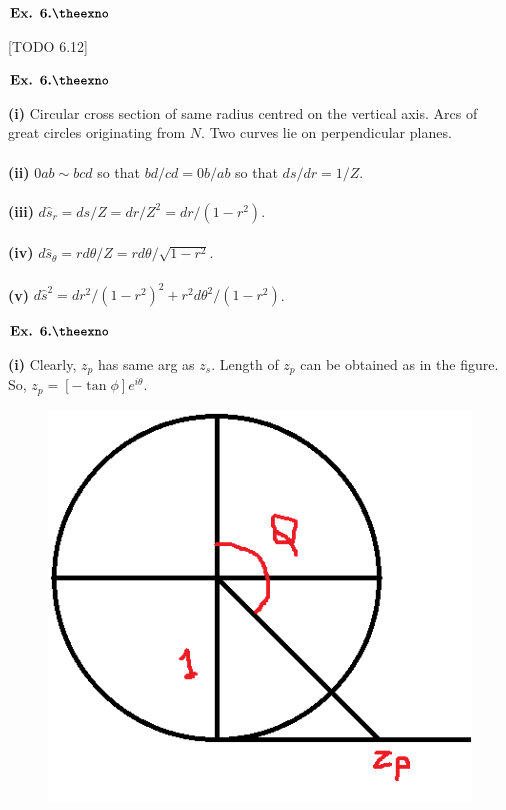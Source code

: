 \documentclass{article}
\def\tf{\textbf}
\newcounter{exno}
\begin{document}
\vspace{0.2in}

${\textbf{Ex. 6.\theexno}}$
\addtocounter{exno}{1}

[TODO 6.12]

\vspace{0.2in}

${\textbf{Ex. 6.\theexno}}$
\addtocounter{exno}{1}

\tf{(i)} Circular cross section of same radius centred on the vertical axis. Arcs of great circles originating from $N$. Two curves lie on perpendicular planes.\\~\\

\tf{(ii)} $0ab \sim bcd$ so that $bd/cd = 0b/ab$ so that $ds/dr = 1/Z$.\\~\\

\tf{(iii)} $d\hat{s}_r = ds/Z = dr/Z^2 = dr/(1-r^2)$.\\~\\

\tf{(iv)} $d\hat{s}_\theta = rd\theta/Z = rd\theta/\sqrt{1-r^2}$.\\~\\

\tf{(v)} $d\hat{s}^2 = dr^2/(1-r^2)^2 + r^2d\theta^2/(1-r^2)$.

\vspace{0.2in}

${\textbf{Ex. 6.\theexno}}$
\addtocounter{exno}{1}

\tf{(i)} Clearly, $z_p$ has same arg as $z_s$. Length of $z_p$ can be obtained as in the figure. So, $z_p=[-\tan\phi]e^{i\theta}$.

\begin{figure}[h!]
    \centering
    \includegraphics[scale=0.7]{6_14}
    \label{6_14}
\end{figure}
\end{document}
